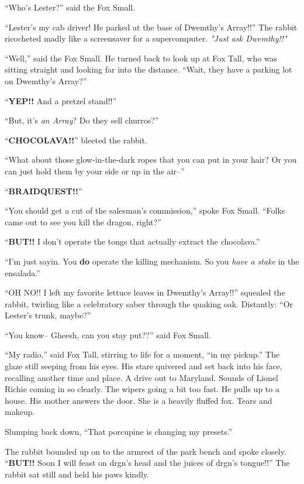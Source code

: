 \documentclass[12pt,twoside]{report}
\begin{document}
``Who's Lester?'' said the Fox Small.

``Lester's my cab driver!  He parked at the base of Dwemthy's
        Array!!''  The rabbit ricocheted madly like a screensaver for
        a supercomputer.  {\em "Just ask Dwemthy!!"}

``Well,'' said the Fox Small.  He turned back to look up at Fox Tall,
        who was sitting straight and looking far into the distance.
        ``Wait, they have a parking lot on Dwemthy's Array?''

``{\bf YEP!!}  And a pretzel stand!!''

``But, it's {\em an Array}?  Do they sell churros?''

``{\bf CHOCOLAVA!!}'' bleeted the rabbit.

``What about those glow-in-the-dark ropes that you can put in your
        hair?  Or you can just hold them by your side or up in the
        air--''

``{\bf BRAIDQUEST!!}''

``You should get a cut of the salesman's commission,'' spoke Fox
        Small.  ``Folks came out to see you kill the dragon, right?''

``{\bf BUT!!}  I don't operate the tongs that actually extract the
        chocolava.''

``I'm just sayin.  You {\bf do} operate the killing mechanism.  So you
        {\em have a stake} in the ensalada.''

``OH NO!!  I left my favorite lettuce leaves in Dwemthy's Array!!''
        squealed the rabbit, twirling like a celebratory saber through
        the quaking oak.  Distantly: ``Or Lester's trunk, maybe?''

``You know-- Gheesh, can you stay put??'' said Fox Small.

``My radio,'' said Fox Tall, stirring to life for a moment, ``in my
        pickup.''  The glaze still seeping from his eyes.  His stare
        quivered and set back into his face, recalling another time
        and place.  A drive out to Maryland.  Sounds of Lionel Richie
        coming in so clearly.  The wipers going a bit too fast.  He
        pulls up to a house.  His mother answers the door. She is a
        heavily fluffed fox.  Tears and makeup.

Slumping back down, ``That porcupine is changing my presets.''

The rabbit bounded up on to the armrest of the park bench and spoke
closely.  ``{\bf BUT!!} Soon I will feast on drgn's head and the
juices of drgn's tongue!!''  The rabbit sat still and held his paws
kindly.
\end{document}
